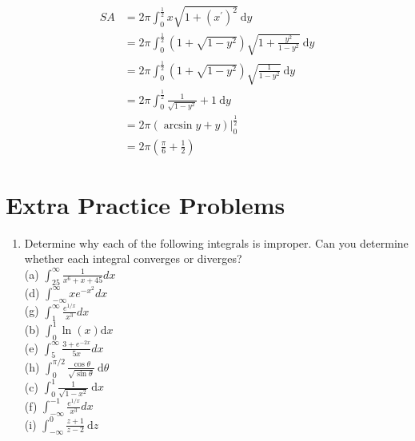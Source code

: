 \documentclass[10pt]{article}
\begin{document}
$$
\begin{aligned}
S A & =2 \pi \int_{0}^{\frac{1}{2}} x \sqrt{1+\left(x^{\prime}\right)^{2}} \mathrm{~d} y \\
& =2 \pi \int_{0}^{\frac{1}{2}}\left(1+\sqrt{1-y^{2}}\right) \sqrt{1+\frac{y^{2}}{1-y^{2}}} \mathrm{~d} y \\
& =2 \pi \int_{0}^{\frac{1}{2}}\left(1+\sqrt{1-y^{2}}\right) \sqrt{\frac{1}{1-y^{2}}} \mathrm{~d} y \\
& =2 \pi \int_{0}^{\frac{1}{2}} \frac{1}{\sqrt{1-y^{2}}}+1 \mathrm{~d} y \\
& =\left.2 \pi(\arcsin y+y)\right|_{0} ^{\frac{1}{2}} \\
& =2 \pi\left(\frac{\pi}{6}+\frac{1}{2}\right)
\end{aligned}
$$

\section*{Extra Practice Problems}
\begin{enumerate}
  \item Determine why each of the following integrals is improper. Can you determine whether each integral converges or diverges?\\
(a) $\int_{25}^{\infty} \frac{1}{x^{6}+x+45} d x$\\
(d) $\int_{-\infty}^{\infty} x e^{-x^{2}} d x$\\
(g) $\int_{1}^{\infty} \frac{e^{1 / x}}{x^{3}} d x$\\
(b) $\int_{0}^{1} \ln (x) \mathrm{d} x$\\
(e) $\int_{5}^{\infty} \frac{3+e^{-2 x}}{5 x} d x$\\
(h) $\int_{0}^{\pi / 2} \frac{\cos \theta}{\sqrt{\sin \theta}} \mathrm{~d} \theta$\\
(c) $\int_{0}^{1} \frac{1}{\sqrt{1-x^{2}}} \mathrm{~d} x$\\
(f) $\int_{-\infty}^{-1} \frac{e^{1 / x}}{x^{3}} d x$\\
(i) $\int_{-\infty}^{0} \frac{z+1}{z-2} \mathrm{~d} z$
\end{enumerate}
\end{document}

